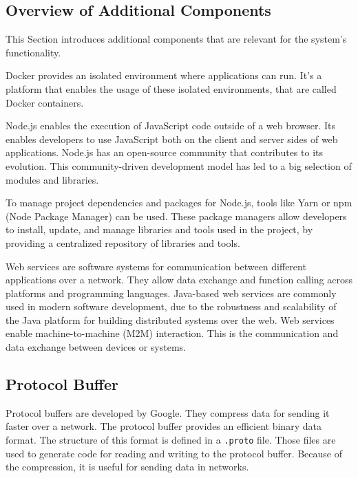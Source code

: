 \documentclass[../MasterThesis.tex]{subfiles}
\begin{document}
\subsection{Overview of Additional Components}
\label{subsection:overview_additional_components}


This Section introduces additional components that are relevant for the system's functionality.


Docker provides an isolated environment where applications can run. It's a platform that enables the usage of these isolated environments, that are called Docker containers.~\cite{docker}


Node.js enables the execution of JavaScript code outside of a web browser.
Its enables developers to use JavaScript both on the client and server sides of web applications. 
Node.js has an open-source community that contributes to its evolution. This community-driven development model has led to a big selection of modules and libraries.~\cite{nodejs, RM_Frontend, ap3_docs}


To manage project dependencies and packages for Node.js, tools like Yarn or npm (Node Package Manager) can be used. These package managers allow developers to install, update, and manage libraries and tools used in the project, by providing a centralized repository of libraries and tools.~\cite{RM_Frontend, npmyarn}



Web services are software systems for communication between different applications over a network. 
They allow data exchange and function calling across platforms and programming languages. 
Java-based web services are commonly used in modern software development, due to the robustness and scalability of the Java platform for building distributed systems over the web.
Web services enable machine-to-machine (M2M) interaction. This is the communication and data exchange between devices or systems.~\cite{webservice}



\subsection{Protocol Buffer}
\label{subsection:protocolbuffer}


Protocol buffers are developed by Google. They compress data for sending it faster over a network. The protocol buffer provides an efficient binary data format. The structure of this format is defined in a \texttt{.proto} file. Those files are used to generate code for reading and writing to the protocol buffer. Because of the compression, it is useful for sending data in networks.~\cite{protobuffer}
\end{document}

